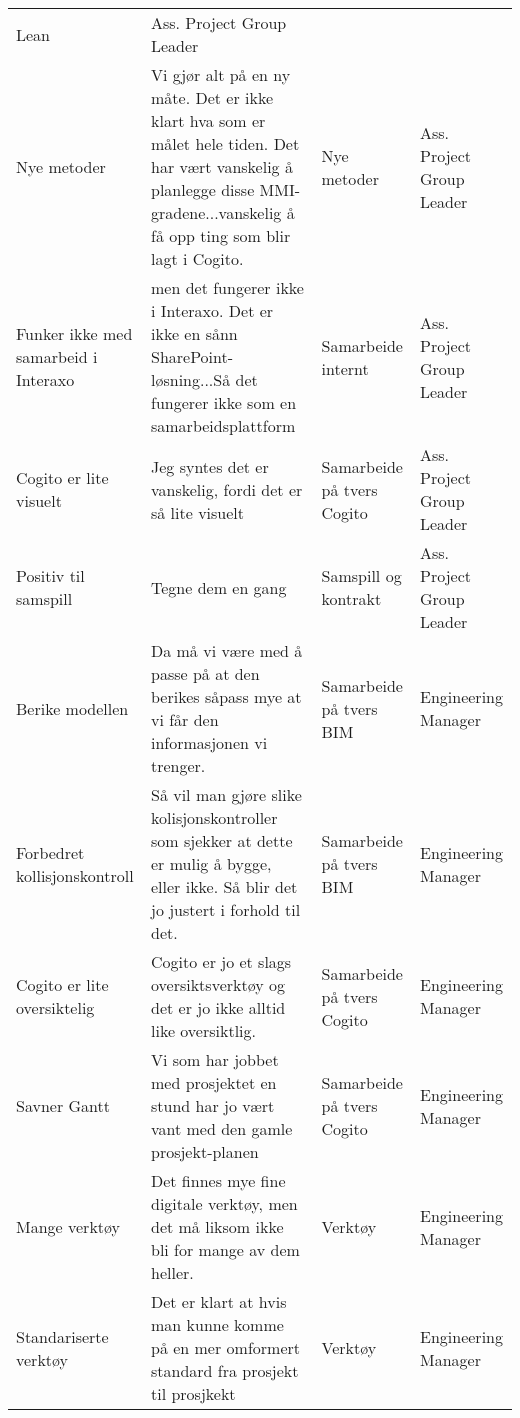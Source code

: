 \begin{landscape}
\begin{longtable}{p{0.25\textheight}p{0.5\textheight}p{0.25\textheight}p{0.25\textheight}}
      Lean &
      Ass. Project Group Leader \\
    Nye metoder &
      Vi gjør alt på en ny måte. Det er ikke klart hva som er målet hele tiden. Det har vært vanskelig å planlegge disse MMI-gradene...vanskelig å få opp ting som blir lagt i Cogito. &
      Nye metoder &
      Ass. Project Group Leader \\
    Funker ikke med samarbeid i Interaxo &
      men det fungerer ikke i Interaxo. Det er ikke en sånn SharePoint-løsning...Så det fungerer ikke som en samarbeidsplattform &
      Samarbeide internt &
      Ass. Project Group Leader \\
    Cogito er lite visuelt &
      Jeg syntes det er vanskelig, fordi det er så lite visuelt &
      Samarbeide på tvers Cogito &
      Ass. Project Group Leader \\
    Positiv til samspill &
      Tegne dem en gang &
      Samspill og kontrakt &
      Ass. Project Group Leader \\
    Berike modellen &
      Da må vi være med å passe på at den berikes såpass mye at vi får den informasjonen vi trenger. &
      Samarbeide på tvers BIM &
      Engineering Manager \\
    Forbedret kollisjonskontroll &
      Så vil man gjøre slike kolisjonskontroller som sjekker at dette er mulig å bygge, eller ikke. Så blir det jo justert i forhold til det. &
      Samarbeide på tvers BIM &
      Engineering Manager \\
    Cogito er lite oversiktelig &
      Cogito er jo et slags oversiktsverktøy og det er jo ikke alltid like oversiktlig. &
      Samarbeide på tvers Cogito &
      Engineering Manager \\
    Savner Gantt &
      Vi som har jobbet med prosjektet en stund har jo vært vant med den gamle prosjekt-planen &
      Samarbeide på tvers Cogito &
      Engineering Manager \\
    Mange verktøy &
      Det finnes mye fine digitale verktøy, men det må liksom ikke bli for mange av dem heller. &
      Verktøy &
      Engineering Manager \\
    Standariserte verktøy &
      Det er klart at hvis man kunne komme på en mer omformert standard fra prosjekt til prosjkekt &
      Verktøy &
      Engineering Manager \\* \bottomrule
    \end{longtable}
    \end{landscape}